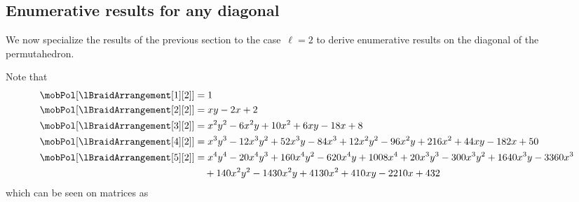 
\subsection{Enumerative results for any diagonal} 
\label{s:facets}

We now specialize the results of the previous section to the case~$\ell = 2$ to derive enumerative results on the diagonal of the permutahedron.

Note that
\begin{align*}
\mobPol[{\lBraidArrangement[1][2]}] & = 1 \\
\mobPol[{\lBraidArrangement[2][2]}] & = x y - 2 x + 2 \\
\mobPol[{\lBraidArrangement[3][2]}] & = x^2 y^2 - 6 x^2 y + 10 x^2 + 6 x y - 18 x + 8 \\
\mobPol[{\lBraidArrangement[4][2]}] & = x^3 y^3 - 12 x^3 y^2 + 52 x^3 y - 84 x^3 + 12 x^2 y^2 - 96 x^2 y + 216 x^2 + 44 x y - 182 x + 50 \\
\mobPol[{\lBraidArrangement[5][2]}] & = x^4 y^4 - 20 x^4 y^3 + 160 x^4 y^2 - 620 x^4 y + 1008 x^4 + 20 x^3 y^3 - 300 x^3 y^2 + 1640 x^3 y - 3360 x^3 \\ & \quad+ 140 x^2 y^2 - 1430 x^2 y + 4130 x^2 + 410 x y - 2210 x + 432
\end{align*}
which can be seen on matrices as
